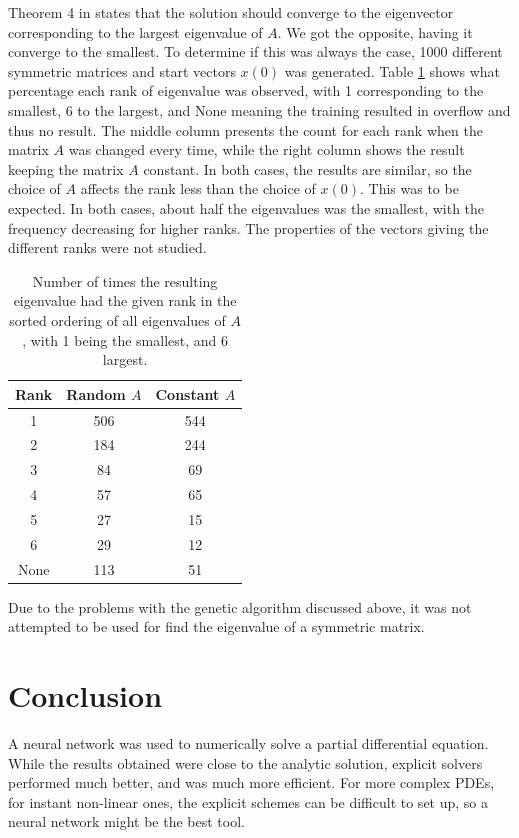 \documentclass[multicolumn, 9pt]{extarticle}
\begin{document}
Theorem 4 in \cite{symmetric} states that the solution should converge to the eigenvector corresponding to the largest eigenvalue of $A$. We got the opposite, having it converge to the smallest. To determine if this was always the case, 1000 different symmetric matrices and start vectors $x(0)$ was generated. Table \ref{tab:idx_cnt} shows what percentage each rank of eigenvalue was observed, with 1 corresponding to the smallest, 6 to the largest, and None meaning the training resulted in overflow and thus no result. The middle column presents the count for each rank when the matrix $A$ was changed every time, while the right column shows the result keeping the matrix $A$ constant. In both cases, the results are similar, so the choice of $A$ affects the rank less than the choice of $x(0)$. This was to be expected. In both cases, about half the eigenvalues was the smallest, with the frequency decreasing for higher ranks. The properties of the vectors giving the different ranks were not studied.

\begin{table}[tb]
	\centering
	\caption{Number of times the resulting eigenvalue had the given rank in the sorted ordering of all eigenvalues of $A$, with 1 being the smallest, and 6 largest.}
	\label{tab:idx_cnt}
	\begin{tabular}{ccc}
		\toprule
		Rank & Random $A$ & Constant  $A$ \\
		\midrule
		1    & 506        & 544           \\
		2    & 184        & 244           \\
		3    & 84         & 69            \\
		4    & 57         & 65            \\
		5    & 27         & 15            \\
		6    & 29         & 12            \\
		None & 113        & 51            \\
		\bottomrule
	\end{tabular}
\end{table}

Due to the problems with the genetic algorithm discussed above, it was not attempted to be used for find the eigenvalue of a symmetric matrix.


\section{Conclusion}

A neural network was used to numerically solve a partial differential equation. While the results obtained were close to the analytic solution, explicit solvers performed much better, and was much more efficient. For more complex PDEs, for instant non-linear ones, the explicit schemes can be difficult to set up, so a neural network might be the best tool.
\end{document}
